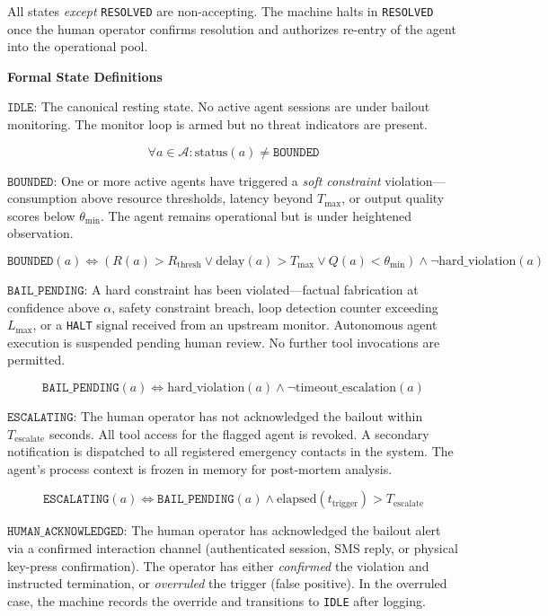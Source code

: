 All states \emph{except} \texttt{RESOLVED} are non-accepting. The machine halts in \texttt{RESOLVED} once the human operator confirms resolution and authorizes re-entry of the agent into the operational pool.

\bigskip
\noindent\textbf{Formal State Definitions}

\bigskip
\noindent$\texttt{IDLE:}$ The canonical resting state. No active agent sessions are under bailout monitoring. The monitor loop is armed but no threat indicators are present.

\[
\forall a \in \mathcal{A}: \text{status}(a) \neq \texttt{BOUNDED}
\]

\bigskip
\noindent$\texttt{BOUNDED:}$ One or more active agents have triggered a \emph{soft constraint} violation—consumption above resource thresholds, latency beyond $T_{\max}$, or output quality scores below $\theta_{\min}$. The agent remains operational but is under heightened observation.

\[
\texttt{BOUNDED}(a) \iff \left( R(a) > R_{\text{thresh}} \lor \text{delay}(a) > T_{\max} \lor Q(a) < \theta_{\min} \right) \land \neg \text{hard\_violation}(a)
\]

\bigskip
\noindent$\texttt{BAIL\_PENDING:}$ A hard constraint has been violated—factual fabrication at confidence above $\alpha$, safety constraint breach, loop detection counter exceeding $L_{\max}$, or a \texttt{HALT} signal received from an upstream monitor. Autonomous agent execution is suspended pending human review. No further tool invocations are permitted.

\[
\texttt{BAIL\_PENDING}(a) \iff \text{hard\_violation}(a) \land \neg \text{timeout\_escalation}(a)
\]

\bigskip
\noindent$\texttt{ESCALATING:}$ The human operator has not acknowledged the bailout within $T_{\text{escalate}}$ seconds. All tool access for the flagged agent is revoked. A secondary notification is dispatched to all registered emergency contacts in the system. The agent's process context is frozen in memory for post-mortem analysis.

\[
\texttt{ESCALATING}(a) \iff \texttt{BAIL\_PENDING}(a) \land \text{elapsed}(t_{\text{trigger}}) > T_{\text{escalate}}
\]

\bigskip
\noindent$\texttt{HUMAN\_ACKNOWLEDGED:}$ The human operator has acknowledged the bailout alert via a confirmed interaction channel (authenticated session, SMS reply, or physical key-press confirmation). The operator has either \emph{confirmed} the violation and instructed termination, or \emph{overruled} the trigger (false positive). In the overruled case, the machine records the override and transitions to \texttt{IDLE} after logging.

